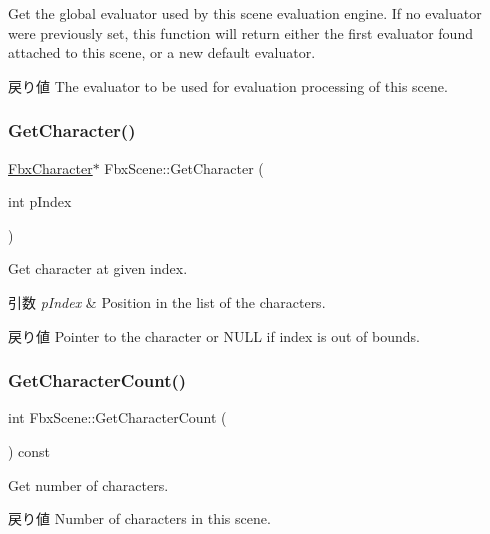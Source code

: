 Get the global evaluator used by this scene evaluation engine. If no evaluator were previously set, this function will return either the first evaluator found attached to this scene, or a new default evaluator. \begin{DoxyReturn}{戻り値}
The evaluator to be used for evaluation processing of this scene. 
\end{DoxyReturn}
\mbox{\label{class_fbx_scene_a1ac7e6cc72f3d3e89dcece88cb9e1fd3}} 
\subsubsection{\texorpdfstring{Get\+Character()}{GetCharacter()}}
{\footnotesize\ttfamily \hyperlink{class_fbx_character}{Fbx\+Character}$\ast$ Fbx\+Scene\+::\+Get\+Character (\begin{DoxyParamCaption}\item[{int}]{p\+Index }\end{DoxyParamCaption})}

Get character at given index. 
\begin{DoxyParams}{引数}
{\em p\+Index} & Position in the list of the characters. \\
\hline
\end{DoxyParams}
\begin{DoxyReturn}{戻り値}
Pointer to the character or {\ttfamily N\+U\+LL} if index is out of bounds. 
\end{DoxyReturn}
\mbox{\label{class_fbx_scene_ab425b0d2df9318234ed67e7276ff823c}} 
\subsubsection{\texorpdfstring{Get\+Character\+Count()}{GetCharacterCount()}}
{\footnotesize\ttfamily int Fbx\+Scene\+::\+Get\+Character\+Count (\begin{DoxyParamCaption}{ }\end{DoxyParamCaption}) const}

Get number of characters. \begin{DoxyReturn}{戻り値}
Number of characters in this scene. 
\end{DoxyReturn}
\mbox{\label{class_fbx_scene_a5e8a233241054d2bbe551fec35f7afb6}} 
